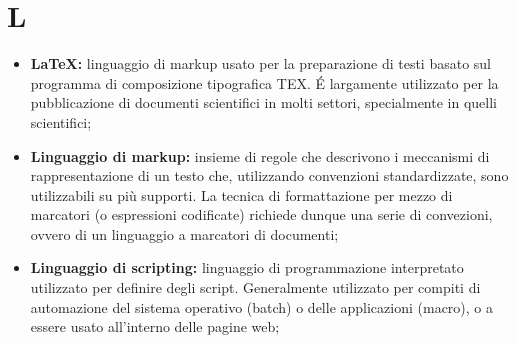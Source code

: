%


\section*{\Huge L} %
\label{sec:l}
	\begin{itemize}
		\item \textbf{\LaTeX:} linguaggio di markup usato per la preparazione di testi basato sul programma di composizione tipografica TEX. É largamente utilizzato per la pubblicazione di documenti scientifici in molti settori, specialmente in quelli scientifici;
		\item \textbf{Linguaggio di markup:} insieme di regole che descrivono i meccanismi di rappresentazione di un testo che, utilizzando convenzioni standardizzate, sono utilizzabili su più supporti. La tecnica di formattazione per mezzo di marcatori (o espressioni codificate) richiede dunque una serie di convezioni, ovvero di un linguaggio a marcatori di documenti;
		\item \textbf{Linguaggio di scripting:} linguaggio di programmazione interpretato utilizzato per definire degli script. Generalmente utilizzato per compiti di automazione del sistema operativo (batch) o delle applicazioni (macro), o a essere usato all'interno delle pagine web;
	\end{itemize}
\pagebreak

